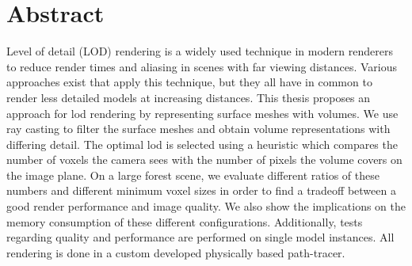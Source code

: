 \chapter*{Abstract}
Level of detail (LOD) rendering is a widely used technique in modern renderers to reduce render times and aliasing in scenes with far viewing distances.
Various approaches exist that apply this technique, but they all have in common to render less detailed models at increasing distances.
This thesis proposes an approach for \acs{lod} rendering by representing surface meshes with volumes.
We use ray casting to filter the surface meshes and obtain volume representations with differing detail.
The optimal \ac{lod} is selected using a heuristic which compares the number of voxels the camera sees with the number of pixels the volume covers on the image plane.
On a large forest scene, we evaluate different ratios of these numbers and different minimum voxel sizes in order to find a tradeoff between a good render performance and image quality.
We also show the implications on the memory consumption of these different configurations.
Additionally, tests regarding quality and performance are performed on single model instances.
All rendering is done in a custom developed physically based path-tracer.